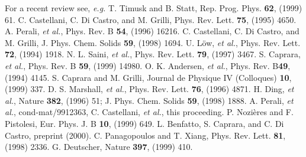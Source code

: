 \documentclass[twoside]{article}
\begin{document}
\begin{thebibliography}{9}

 For a recent review see, {\it e.g.} T. Timusk and 
B. Statt, Rep. Prog. Phys. {\bf 62}, (1999) 61.
 C. Castellani, C. Di Castro, and M. Grilli, 
Phys. Rev. Lett. {\bf 75}, (1995) 4650.
 A. Perali, {\sl et al.}, 
Phys. Rev. B {\bf 54}, (1996) 16216.
 C. Castellani, C. Di Castro, and M. Grilli, 
J. Phys. Chem. Solids {\bf 59}, (1998) 1694.
 U. L\"{o}w, {\sl et al.}, Phys. Rev. Lett. {\bf 72}, (1994) 1918.
 N. L. Saini, {\sl et al.}, Phys. Rev. Lett. {\bf 79}, (1997) 
3467.
 S. Caprara, {\sl et al.}, 
Phys. Rev. B {\bf 59}, (1999) 14980.
 O. K. Andersen, {\em et al.}, Phys. Rev. B{\bf 49}, 
(1994) 4145.
 S. Caprara and M. Grilli, 
Journal de Physique IV (Colloques) {\bf 10}, (1999) 337.
 D. S. Marshall, {\em et al.}, Phys. Rev. Lett. {\bf 76}, 
(1996) 4871.
 H. Ding, {\em et al.}, Nature {\bf 382}, (1996) 51; 
J. Phys. Chem. Solids {\bf 59}, (1998) 1888.
 A. Perali, {\sl et al.}, cond-mat/9912363, 
C. Castellani, {\sl et al.}, this 
proceeding.
 P. Nozi\`{e}res and F. Pistolesi, Eur. Phys. J. B {\bf 10}, 
(1999) 649.
 L. Benfatto, S. Caprara, and C. Di Castro, preprint (2000).
 C. Panagopoulos and T. Xiang, Phys. Rev. Lett. {\bf 81}, (1998) 
2336.
 G. Deutscher, Nature {\bf 397}, (1999) 410.
\end{thebibliography}
\end{document}
